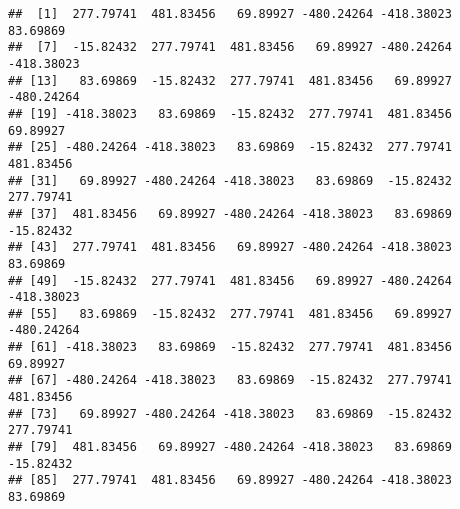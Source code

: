 \documentclass[
]{article}
\newenvironment{Shaded}{\begin{snugshade}}{\end{snugshade}}
\newcommand{\AttributeTok}[1]{\textcolor[rgb]{0.13,0.29,0.53}{#1}}
\newcommand{\DecValTok}[1]{\textcolor[rgb]{0.00,0.00,0.81}{#1}}
\newcommand{\FunctionTok}[1]{\textcolor[rgb]{0.13,0.29,0.53}{\textbf{#1}}}
\newcommand{\NormalTok}[1]{#1}
\newcommand{\SpecialCharTok}[1]{\textcolor[rgb]{0.81,0.36,0.00}{\textbf{#1}}}
\newcommand{\StringTok}[1]{\textcolor[rgb]{0.31,0.60,0.02}{#1}}
\begin{document}
\begin{verbatim}
##  [1]  277.79741  481.83456   69.89927 -480.24264 -418.38023   83.69869
##  [7]  -15.82432  277.79741  481.83456   69.89927 -480.24264 -418.38023
## [13]   83.69869  -15.82432  277.79741  481.83456   69.89927 -480.24264
## [19] -418.38023   83.69869  -15.82432  277.79741  481.83456   69.89927
## [25] -480.24264 -418.38023   83.69869  -15.82432  277.79741  481.83456
## [31]   69.89927 -480.24264 -418.38023   83.69869  -15.82432  277.79741
## [37]  481.83456   69.89927 -480.24264 -418.38023   83.69869  -15.82432
## [43]  277.79741  481.83456   69.89927 -480.24264 -418.38023   83.69869
## [49]  -15.82432  277.79741  481.83456   69.89927 -480.24264 -418.38023
## [55]   83.69869  -15.82432  277.79741  481.83456   69.89927 -480.24264
## [61] -418.38023   83.69869  -15.82432  277.79741  481.83456   69.89927
## [67] -480.24264 -418.38023   83.69869  -15.82432  277.79741  481.83456
## [73]   69.89927 -480.24264 -418.38023   83.69869  -15.82432  277.79741
## [79]  481.83456   69.89927 -480.24264 -418.38023   83.69869  -15.82432
## [85]  277.79741  481.83456   69.89927 -480.24264 -418.38023   83.69869
\end{verbatim}

\begin{Shaded}
\end{Shaded}
\end{document}
